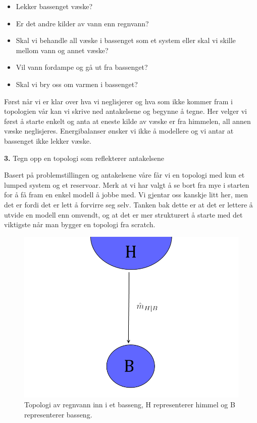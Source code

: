 \begin{itemize}
    \item Lekker bassenget væske?
    \item Er det andre kilder av vann enn regnvann?
    \item Skal vi behandle all væske i bassenget som et system eller skal vi skille mellom vann og annet væske?
    \item Vil vann fordampe og gå ut fra bassenget?
    \item Skal vi bry oss om varmen i bassenget?
\end{itemize}

Først når vi er klar over hva vi neglisjerer og hva som ikke kommer fram i topologien vår kan vi skrive ned antakelsene og begynne å tegne. Her velger vi først å starte enkelt og anta at eneste kilde av væske er fra himmelen, all annen væske neglisjeres. Energibalanser ønsker vi ikke å modellere og vi antar at bassenget ikke lekker væske. 

\begin{center}
\textbf{3.} Tegn opp en topologi som reflekterer antakelsene
\end{center}

Basert på problemstillingen og antakelsene våre får vi en topologi med kun et lumped system og et reservoar. Merk at vi har valgt å se bort fra mye i starten for å få fram en enkel modell å jobbe med. Vi gjentar oss kanskje litt her, men det er fordi det er lett å forvirre seg selv. Tanken bak dette er at det er lettere å utvide en modell enn omvendt, og at det er mer strukturert å starte med det viktigste når man bygger en topologi fra scratch. 
\begin{figure}[H]
    \centering
    \includegraphics[scale=0.3]{Figures/Basseng1.png}
    \caption{Topologi av regnvann inn i et basseng, H representerer himmel og B representerer basseng.}
    \label{fig:topologi_enkel1}
\end{figure}

